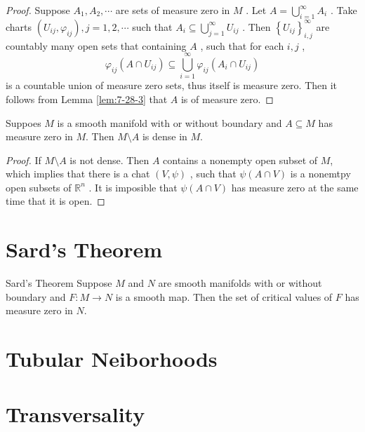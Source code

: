 \documentclass[../main.tex]{subfiles}
\begin{document}
\begin{proof}
    Suppose \(  A_1,A_2,\cdots   \) are sets of measure zero in \(  M  \) . Let \(  A = \bigcup _{i= 1}^{\infty}A_{i}  \) . Take charts \(  \left( U_{ij}, \varphi _{ij} \right), j = 1,2,\cdots    \) such that  \(  A_{i}\subseteq  \bigcup _{j = 1}^{\infty}U_{ij}  \) .    Then \(  \left\{ U_{ij} \right\}_{i,j}^{\infty}  \) are countably many open sets that containing \(  A  \) , such that for each \(  i,j  \) ,  \[
     \varphi _{ij}\left( A\cap U_{ij} \right)\subseteq \bigcup _{i = 1}^{\infty} \varphi _{ij}\left( A_{i}\cap U_{ij} \right)  
    \]    is a countable union of measure zero sets, thus itself is measure zero. Then it follows from Lemma \ref{lem:7-28-3} that \(  A  \) is of measure zero.  
\end{proof}

\begin{proposition}{}{}
    Suppoes \(  M  \) is a smooth manifold with or without boundary and \(  A\subseteq M  \) has measure zero in  \(  M  \). Then \(  M\setminus A  \) is dense in \(  M  \).      
\end{proposition}
\begin{proof}
    If  \(  M\setminus A  \) is not dense. Then \(  A  \) contains a nonempty open subset of \(  M  \), which implies that there is a chat \(  \left( V,\psi  \right)   \) , such that  \(  \psi \left( A\cap V \right)   \) is a nonemtpy open subsets of \(  \mathbb{R} ^{n}  \) . It is imposible that  \(  \psi \left( A\cap V \right)   \) has measure zero at the same time that it is open.          
\end{proof}

\section{Sard's Theorem}

\begin{theorem}{Sard's Theorem}{}
Suppose $M$ and $N$ are smooth manifolds with or without boundary and $F : M \to N$ is a smooth map. Then the set of critical values of $F$ has measure zero in $N$.
\end{theorem}

\section{Tubular Neiborhoods }

\section{Transversality}
\end{document}
